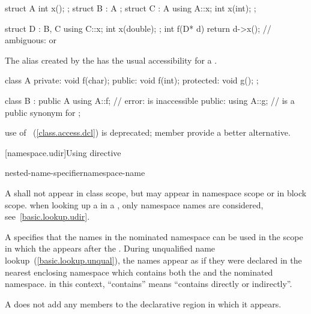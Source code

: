 \begin{codeblock}
struct A { int x(); };
struct B : A { };
struct C : A {
    using A::x;
    int x(int);
};

struct D : B, C {
    using C::x;
    int x(double);
};
int f(D* d) {
    return d->x();		// ambiguous:  or 
}
\end{codeblock}
\exitnote

\pnum
The alias created by the  has the usual
accessibility for a .
\enterexample

\begin{codeblock}
class A {
private:
	void f(char);
public:
	void f(int);
protected:
	void g();
};

class B : public A {
	using A::f;		// error:  is inaccessible
public:
	using A::g;		//  is a public synonym for 
};
\end{codeblock}
\exitexampleb

\pnum
\enternote
use of ~(\ref{class.access.dcl}) is
deprecated; member  provide a better
alternative.
\exitnote
{}

[namespace.udir]{Using directive}%

\begin{bnf}
\br
     nested-name-specifier\opt namespace-name \terminal{;}
\end{bnf}

A  shall not appear in class scope, but may
appear in namespace scope or in block scope.
\enternote
when looking up a  in a
, only namespace names are considered,
see~\ref{basic.lookup.udir}.
\exitnote

\pnum
A  specifies that the names in the nominated
namespace can be used in the scope in which the
 appears after the .
During unqualified name lookup~(\ref{basic.lookup.unqual}), the names
appear as if they were declared in the nearest enclosing namespace which
contains both the  and the nominated
namespace.
\enternote
in this context, ``contains'' means ``contains directly or indirectly''.
\exitnote

A  does not add any members to the declarative
region in which it appears.
\enterexample

